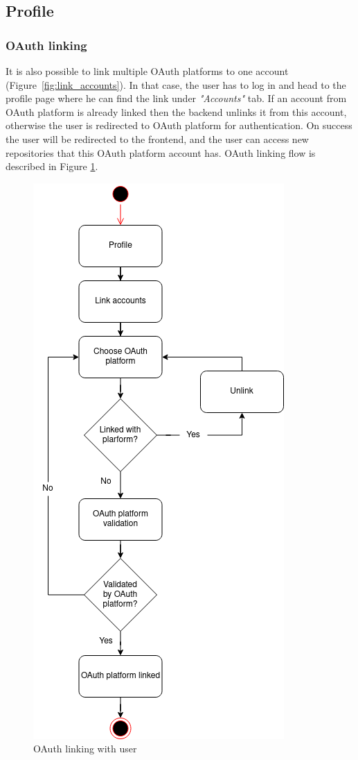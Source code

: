 \subsection{Profile}\label{subsec:profile}
\subsubsection{OAuth linking}\label{subsubsec:oauth-linking}
It is also possible to link multiple OAuth platforms to one account (Figure~\ref{fig:link_accounts}).
In that case, the user has to log in and head to the profile page where he can find the link  under \textit{"Accounts"} tab.
If an account from OAuth platform is already linked then the backend unlinks it from this account, otherwise the user is redirected to OAuth platform for authentication.
On success the user will be redirected to the frontend, and the user can access new repositories that this OAuth platform account has.
OAuth linking flow is described in Figure
\ref{fig:account-linking}.

\begin{figure}[H]
    \centering
    \includegraphics[width=0.5\linewidth]{figures/oauth_linking_user_flow}
    \caption{OAuth linking with user}
    \label{fig:account-linking}
\end{figure}

